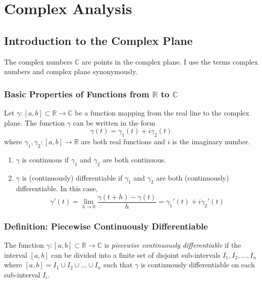 \documentclass[11pt, a4paper]{article}
\newcommand{\R}{\mathbb{R}} %
\newcommand{\C}{\mathbb{C}} %
\begin{document}
\section{Complex Analysis}

\subsection{Introduction to the Complex Plane}

The complex numbers $ \C $ are points in the complex plane. I use the terms complex numbers and complex plane synonymously.

\subsubsection{Basic Properties of Functions from $ \R $ to $ \C $}
Let $ \gamma : [a, b] \subset \R \to \C $ be a function mapping from the real line to the complex plane. The function $ \gamma $ can be written in the form
\begin{equation*}
	\gamma(t) = \gamma_1(t) + i \gamma_2(t)
\end{equation*}
where $ \gamma_1, \gamma_2 : [a, b] \to \R $ are both real functions and $ i $ is the imaginary number.

\begin{enumerate}
	\item $ \gamma $ is continuous if $ \gamma_1 $ and $ \gamma_2 $ are both continuous.
	\item $ \gamma $ is (continuously) differentiable if $ \gamma_1 $ and $ \gamma_2 $ are both (continuously) differentiable. In this case,
	\begin{equation*}
		\gamma'(t) = \lim_{h \to 0} \frac{\gamma(t + h) - \gamma(t)}{h} = \gamma_1'(t) + i \gamma_2'(t)
	\end{equation*}
\end{enumerate}

\subsubsection{Definition: Piecewise Continuously Differentiable}
The function $ \gamma : [a, b] \subset \R \to \C $ is \textit{piecewise continuously differentiable} if the interval $ [a, b] $ can be divided into a finite set of disjoint sub-intervals $ I_1, I_2, \dots, I_n $ where $ [a, b] = I_1 \cup  I_2 \cup \dots \cup I_n $ such that $ \gamma $ is continuously differentiable on each sub-interval $ I_i $.
\end{document}
